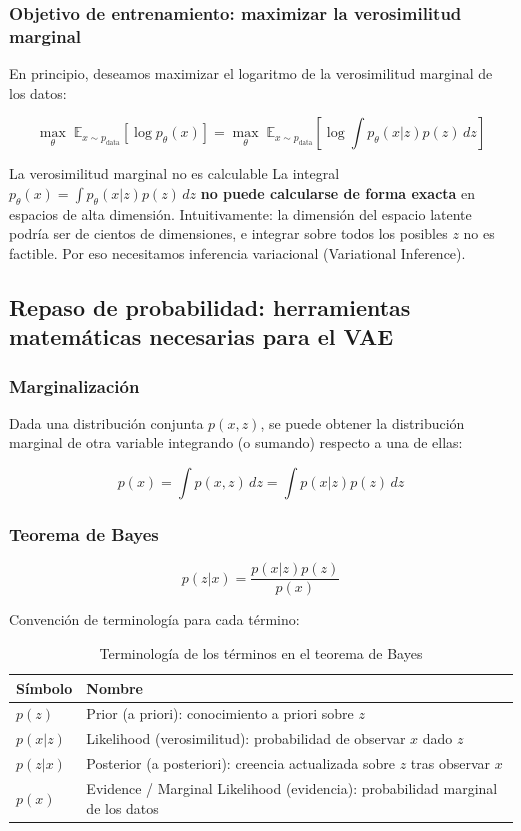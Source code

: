 \subsubsection{Objetivo de entrenamiento: maximizar la verosimilitud marginal}

En principio, deseamos maximizar el logaritmo de la verosimilitud marginal de los datos:

$$\max_\theta \; \mathbb{E}_{x \sim p_{\text{data}}} [\log p_\theta(x)] = \max_\theta \; \mathbb{E}_{x \sim p_{\text{data}}} \left[\log \int p_\theta(x|z) p(z) \, dz \right]$$

\begin{warningbox}{La verosimilitud marginal no es calculable}
La integral $p_\theta(x) = \int p_\theta(x|z) p(z) \, dz$ \textbf{no puede calcularse de forma exacta} en espacios de alta dimensión. Intuitivamente: la dimensión del espacio latente podría ser de cientos de dimensiones, e integrar sobre todos los posibles $z$ no es factible. Por eso necesitamos inferencia variacional (Variational Inference).
\end{warningbox}

\subsection{Repaso de probabilidad: herramientas matemáticas necesarias para el VAE}

\subsubsection{Marginalización}

Dada una distribución conjunta $p(x, z)$, se puede obtener la distribución marginal de otra variable integrando (o sumando) respecto a una de ellas:

$$p(x) = \int p(x, z) \, dz = \int p(x|z) p(z) \, dz$$

\subsubsection{Teorema de Bayes}

$$p(z|x) = \frac{p(x|z) p(z)}{p(x)}$$

Convención de terminología para cada término:

\begin{table}[H]
\centering
\begin{tabular}{ll}
\toprule
Símbolo & Nombre \\
\midrule
$p(z)$ & Prior (a priori): conocimiento a priori sobre $z$ \\
$p(x|z)$ & Likelihood (verosimilitud): probabilidad de observar $x$ dado $z$ \\
$p(z|x)$ & Posterior (a posteriori): creencia actualizada sobre $z$ tras observar $x$ \\
$p(x)$ & Evidence / Marginal Likelihood (evidencia): probabilidad marginal de los datos \\
\bottomrule
\end{tabular}
\caption{Terminología de los términos en el teorema de Bayes}
\end{table}

